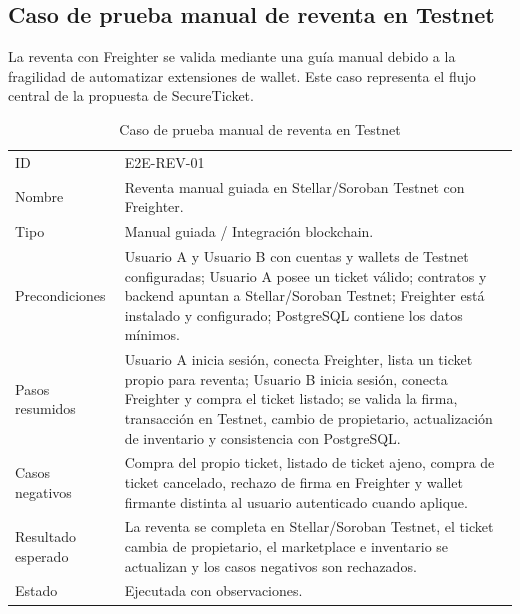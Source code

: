 \documentclass[12pt,letterpaper]{article}
\newcommand{\NombreProyecto}{SecureTicket}
\begin{document}
\begin{table}[H]
\endgroup
\caption{Casos de prueba frontend y end-to-end}
\label{tab:casos-prueba-frontend-e2e}
\end{table}

\subsection{Caso de prueba manual de reventa en Testnet}

La reventa con Freighter se valida mediante una guía manual debido a la fragilidad de automatizar extensiones de wallet. Este caso representa el flujo central de la propuesta de \NombreProyecto{}.

\begin{table}[H]
\centering
\begingroup
\scriptsize
\setlength{\tabcolsep}{3pt}
\renewcommand{\arraystretch}{1.22}

\begin{tabularx}{\textwidth}{|
>{\raggedright\arraybackslash}p{3.0cm}|
>{\raggedright\arraybackslash}X|}
\hline
\multicolumn{1}{|>{\centering\arraybackslash}m{3.0cm}|}{\textbf{Campo}} &
\multicolumn{1}{>{\centering\arraybackslash}m{11.3cm}|}{\textbf{Descripción}} \\
\hline
ID & E2E-REV-01 \\
\hline
Nombre & Reventa manual guiada en Stellar/Soroban Testnet con Freighter. \\
\hline
Tipo & Manual guiada / Integración blockchain. \\
\hline
Precondiciones & Usuario A y Usuario B con cuentas y wallets de Testnet configuradas; Usuario A posee un ticket válido; contratos y backend apuntan a Stellar/Soroban Testnet; Freighter está instalado y configurado; PostgreSQL contiene los datos mínimos. \\
\hline
Pasos resumidos & Usuario A inicia sesión, conecta Freighter, lista un ticket propio para reventa; Usuario B inicia sesión, conecta Freighter y compra el ticket listado; se valida la firma, transacción en Testnet, cambio de propietario, actualización de inventario y consistencia con PostgreSQL. \\
\hline
Casos negativos & Compra del propio ticket, listado de ticket ajeno, compra de ticket cancelado, rechazo de firma en Freighter y wallet firmante distinta al usuario autenticado cuando aplique. \\
\hline
Resultado esperado & La reventa se completa en Stellar/Soroban Testnet, el ticket cambia de propietario, el marketplace e inventario se actualizan y los casos negativos son rechazados. \\
\hline
Estado & Ejecutada con observaciones. \\
\hline
\end{tabularx}

\endgroup
\caption{Caso de prueba manual de reventa en Testnet}
\label{tab:caso-prueba-reventa-testnet}
\end{table}
\end{document}

